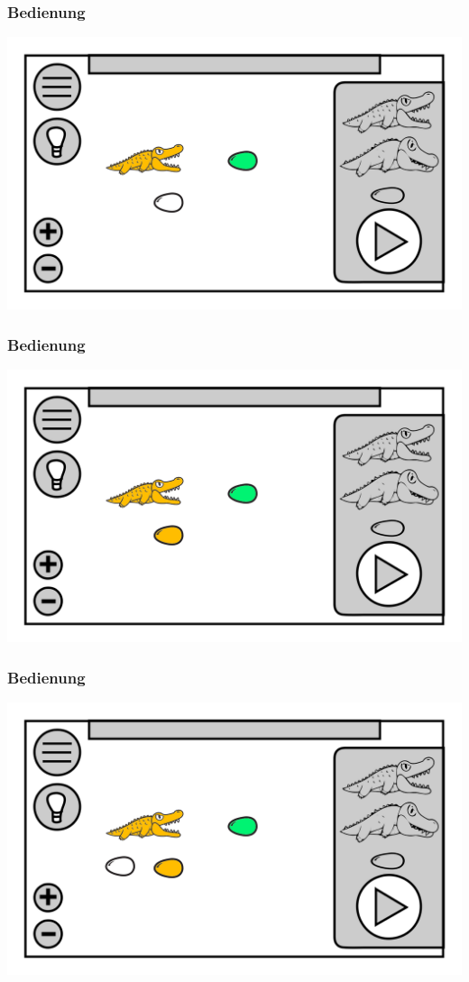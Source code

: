 \documentclass[t]{beamer}
\begin{document}
\begin{frame}
	\frametitle{Bedienung}
	\includegraphics[height=\textheight]{level_colored_croc0.png}
\end{frame}
\begin{frame}
	\frametitle{Bedienung}
	\includegraphics[height=\textheight]{level_colored_croc01.png}
\end{frame}
\begin{frame}
	\frametitle{Bedienung}
	\includegraphics[height=\textheight]{level_colored_croc1.png}
\end{frame}
\end{document}
